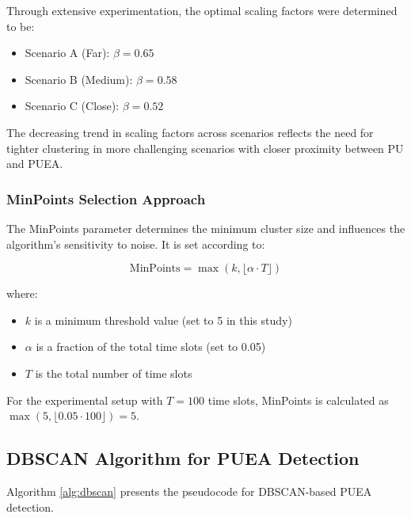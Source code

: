 Through extensive experimentation, the optimal scaling factors were determined to be:
\begin{itemize}
    \item Scenario A (Far): $\beta = 0.65$
    \item Scenario B (Medium): $\beta = 0.58$
    \item Scenario C (Close): $\beta = 0.52$
\end{itemize}

The decreasing trend in scaling factors across scenarios reflects the need for tighter clustering in more challenging scenarios with closer proximity between PU and PUEA.

\subsubsection{MinPoints Selection Approach}

The MinPoints parameter determines the minimum cluster size and influences the algorithm's sensitivity to noise. It is set according to:

\begin{equation}
    \text{MinPoints} = \max(k, \lfloor \alpha \cdot T \rfloor)
\end{equation}

where:
\begin{itemize}
    \item $k$ is a minimum threshold value (set to 5 in this study)
    \item $\alpha$ is a fraction of the total time slots (set to 0.05)
    \item $T$ is the total number of time slots
\end{itemize}

For the experimental setup with $T = 100$ time slots, MinPoints is calculated as $\max(5, \lfloor 0.05 \cdot 100 \rfloor) = 5$.

\subsection{DBSCAN Algorithm for PUEA Detection}

Algorithm \ref{alg:dbscan} presents the pseudocode for DBSCAN-based PUEA detection.

